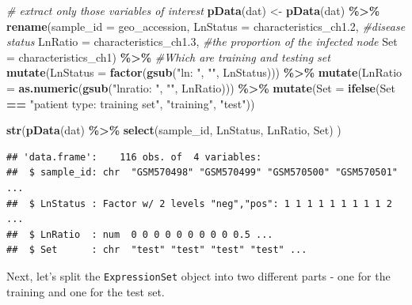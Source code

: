 \documentclass[
]{article}
\newenvironment{Shaded}{\begin{snugshade}}{\end{snugshade}}
\newcommand{\AttributeTok}[1]{\textcolor[rgb]{0.13,0.29,0.53}{#1}}
\newcommand{\CommentTok}[1]{\textcolor[rgb]{0.56,0.35,0.01}{\textit{#1}}}
\newcommand{\FloatTok}[1]{\textcolor[rgb]{0.00,0.00,0.81}{#1}}
\newcommand{\FunctionTok}[1]{\textcolor[rgb]{0.13,0.29,0.53}{\textbf{#1}}}
\newcommand{\NormalTok}[1]{#1}
\newcommand{\OtherTok}[1]{\textcolor[rgb]{0.56,0.35,0.01}{#1}}
\newcommand{\SpecialCharTok}[1]{\textcolor[rgb]{0.81,0.36,0.00}{\textbf{#1}}}
\newcommand{\StringTok}[1]{\textcolor[rgb]{0.31,0.60,0.02}{#1}}
\begin{document}
\begin{Shaded}
\begin{Highlighting}[]
\CommentTok{\# extract only those variables of interest }
\FunctionTok{pData}\NormalTok{(dat) }\OtherTok{\textless{}{-}} \FunctionTok{pData}\NormalTok{(dat) }\SpecialCharTok{\%\textgreater{}\%}
  \FunctionTok{rename}\NormalTok{(}\AttributeTok{sample\_id =}\NormalTok{ geo\_accession,}
         \AttributeTok{LnStatus =}\NormalTok{ characteristics\_ch1}\FloatTok{.2}\NormalTok{, }\CommentTok{\#disease status}
         \AttributeTok{LnRatio =}\NormalTok{ characteristics\_ch1}\FloatTok{.3}\NormalTok{, }\CommentTok{\#the proportion of the infected node}
         \AttributeTok{Set =}\NormalTok{ characteristics\_ch1) }\SpecialCharTok{\%\textgreater{}\%} \CommentTok{\#Which are training and testing set }
  \FunctionTok{mutate}\NormalTok{(}\AttributeTok{LnStatus =} \FunctionTok{factor}\NormalTok{(}\FunctionTok{gsub}\NormalTok{(}\StringTok{"ln: "}\NormalTok{, }\StringTok{""}\NormalTok{, LnStatus))) }\SpecialCharTok{\%\textgreater{}\%}
  \FunctionTok{mutate}\NormalTok{(}\AttributeTok{LnRatio =} \FunctionTok{as.numeric}\NormalTok{(}\FunctionTok{gsub}\NormalTok{(}\StringTok{"lnratio: "}\NormalTok{, }\StringTok{""}\NormalTok{, LnRatio))) }\SpecialCharTok{\%\textgreater{}\%}
  \FunctionTok{mutate}\NormalTok{(}\AttributeTok{Set =} \FunctionTok{ifelse}\NormalTok{(Set }\SpecialCharTok{==} \StringTok{"patient type: training set"}\NormalTok{, }\StringTok{"training"}\NormalTok{, }\StringTok{"test"}\NormalTok{))}

\FunctionTok{str}\NormalTok{(}\FunctionTok{pData}\NormalTok{(dat) }\SpecialCharTok{\%\textgreater{}\%} \FunctionTok{select}\NormalTok{(sample\_id, LnStatus, LnRatio, Set) )}
\end{Highlighting}
\end{Shaded}

\begin{verbatim}
## 'data.frame':    116 obs. of  4 variables:
##  $ sample_id: chr  "GSM570498" "GSM570499" "GSM570500" "GSM570501" ...
##  $ LnStatus : Factor w/ 2 levels "neg","pos": 1 1 1 1 1 1 1 1 1 2 ...
##  $ LnRatio  : num  0 0 0 0 0 0 0 0 0 0.5 ...
##  $ Set      : chr  "test" "test" "test" "test" ...
\end{verbatim}

Next, let's split the \texttt{ExpressionSet} object into two different
parts - one for the training and one for the test set.

\begin{Shaded}
\end{Shaded}
\end{document}
